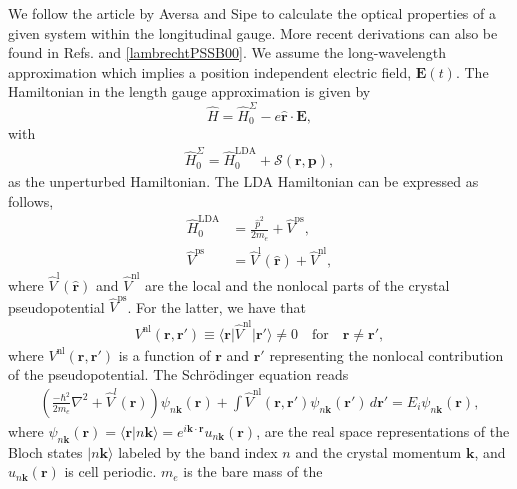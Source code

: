 We follow the article by Aversa and Sipe \cite{aversaPRB95} to calculate the
optical properties of a given system within the longitudinal gauge. More recent
derivations can also be found in Refs. \cite{sipePRB00} and
\ref{lambrechtPSSB00}. We assume the long-wavelength approximation which implies
a position independent electric field, $\mathbf{E}(t)$. The Hamiltonian in the
length gauge approximation is given by
\begin{equation}\label{ache}
\hat{H}=\hat{H}^{\Sigma}_{0} - e\hat{\mathbf{r}}\cdot\mathbf{E},
\end{equation}
with
\begin{align}\label{ache.1}
  \hat{H}^{\Sigma}_{0} = \hat{H}^{\mathrm{LDA}}_{0}
+ \mathcal{S}(\mathbf{r},\mathbf{p}),
\end{align} 
as the unperturbed Hamiltonian. The LDA Hamiltonian can be expressed as follows,
\begin{align}\label{ache.2}
\hat{H}^{\mathrm{LDA}}_{0}
&= \frac{\hat{p}^{2}}{2m_{e}} + \hat{V}^{\mathrm{ps}},\nonumber\\
\hat{V}^{\mathrm{ps}}
&= \hat{V}^{\mathrm{l}}(\hat{\mathbf{r}}) + \hat{V}^{\mathrm{nl}},
\end{align}  
where $\hat{V}^{\mathrm{l}}(\hat{\mathbf{r}})$ and $\hat{V}^{\mathrm{nl}}$ are
the local and the nonlocal parts of the crystal pseudopotential
$\hat{V}^{\mathrm{ps}}$. For the latter, we have that
\begin{align}\label{ache.3n}
V^{\mathrm{nl}}(\mathbf{r},\mathbf{r}')\equiv
\langle\mathbf{r}\vert
\hat{V}^{\mathrm{nl}}
\vert\mathbf{r}'\rangle \neq 0 
\quad\text{for}\quad\mathbf{r} \neq \mathbf{r}',
\end{align}
where $V^{\mathrm{nl}}(\mathbf{r},\mathbf{r}')$ is a function of $\mathbf{r}$
and $\mathbf{r}'$ representing the nonlocal contribution of the pseudopotential.
The Schr\"odinger equation reads
\begin{align}\label{ache.4} 
\left(
\frac{-\hbar^2}{2m_{e}}\nabla^{2}
+ \hat{V}^l(\mathbf{r})
\right)
\psi_{n\mathbf{k}}(\mathbf{r})
+ \int\hat{V}^{\mathrm{nl}}(\mathbf{r},\mathbf{r}')
  \psi_{n\mathbf{k}}(\mathbf{r}')\,d\mathbf{r}'
= E_{i}\psi_{n\mathbf{k}}(\mathbf{r}),
\end{align} 
where $\psi_{n\mathbf{k}}(\mathbf{r}) = \langle\mathbf{r}|n\mathbf{k}\rangle =
e^{i\mathbf{k}\cdot\mathbf{r}}u_{n\mathbf{k}}(\mathbf{r})$, are the real space
representations of the Bloch states $|n\mathbf{k}\rangle$ labeled by the band
index $n$ and the crystal momentum $\mathbf{k}$, and
$u_{n\mathbf{k}}(\mathbf{r})$ is cell periodic. $m_{e}$ is the bare mass of the
